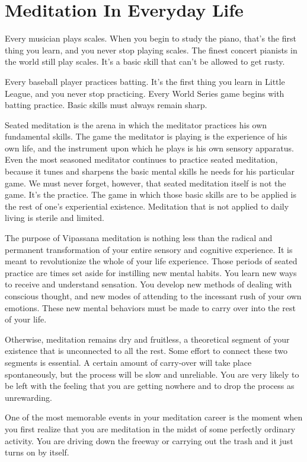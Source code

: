 \section{ Meditation In Everyday Life} Every musician plays scales. When you
begin to study the piano, that's the first thing you learn, and you never stop
playing scales. The finest concert pianists in the world still play scales. It's
a basic skill that can't be allowed to get rusty.

Every baseball player practices batting. It's the first thing you learn in
Little League, and you never stop practicing. Every World Series game begins
with batting practice. Basic skills must always remain sharp.

Seated meditation is the arena in which the meditator practices his own
fundamental skills. The game the meditator is playing is the experience of his
own life, and the instrument upon which he plays is his own sensory apparatus.
Even the most seasoned meditator continues to practice seated meditation,
because it tunes and sharpens the basic mental skills he needs for his
particular game. We must never forget, however, that seated meditation itself is
not the game. It's the practice. The game in which those basic skills are to be
applied is the rest of one's experiential existence. Meditation that is not
applied to daily living is sterile and limited.

The purpose of Vipassana meditation is nothing less than the radical and
permanent transformation of your entire sensory and cognitive experience. It is
meant to revolutionize the whole of your life experience. Those periods of
seated practice are times set aside for instilling new mental habits. You learn
new ways to receive and understand sensation. You develop new methods of dealing
with conscious thought, and new modes of attending to the incessant rush of your
own emotions. These new mental behaviors must be made to carry over into the
rest of your life.

Otherwise, meditation remains dry and fruitless, a theoretical segment of your
existence that is unconnected to all the rest. Some effort to connect these two
segments is essential. A certain amount of carry-over will take place
spontaneously, but the process will be slow and unreliable. You are very likely
to be left with the feeling that you are getting nowhere and to drop the process
as unrewarding.

One of the most memorable events in your meditation career is the moment when
you first realize that you are meditation in the midst of some perfectly
ordinary activity. You are driving down the freeway or carrying out the trash
and it just turns on by itself.

